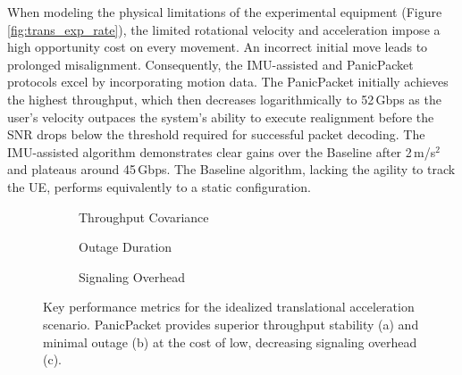 \documentclass[fleqn,10pt]{wlscirep}
\begin{document}
When modeling the physical limitations of the experimental equipment (Figure \ref{fig:trans_exp_rate}), the limited rotational velocity and acceleration impose a high opportunity cost on every movement. An incorrect initial move leads to prolonged misalignment. Consequently, the IMU-assisted and PanicPacket protocols excel by incorporating motion data. The PanicPacket initially achieves the highest throughput, which then decreases logarithmically to 52\,Gbps as the user's velocity outpaces the system's ability to execute realignment before the SNR drops below the threshold required for successful packet decoding. The IMU-assisted algorithm demonstrates clear gains over the Baseline after 2\,m/s$^2$ and plateaus around 45\,Gbps. The Baseline algorithm, lacking the agility to track the UE, performs equivalently to a static configuration.

\begin{figure}[ht!]
    \centering
    \begin{subfigure}[t]{0.49\textwidth}
        \vspace{0pt} %
        \centering
        
        \vspace{-25 pt}
        \caption{Throughput Covariance}
        \label{fig:trans_metrics_covariance}
    \end{subfigure}%
    \hfill
    \begin{minipage}[t]{0.49\textwidth}
        \vspace{0pt} %
        \centering
        \begin{subfigure}{\linewidth}
        
        \vspace{-25 pt}
        \caption{Outage Duration}
        \label{fig:trans_metrics_outage}
    \end{subfigure}
    \vfill
        \begin{subfigure}{\linewidth}
        
        \vspace{-25 pt}
        \caption{Signaling Overhead}
        \label{fig:trans_metrics_overhead}
    \end{subfigure}
    \end{minipage}
    \caption{Key performance metrics for the idealized translational acceleration scenario. PanicPacket provides superior throughput stability (a) and minimal outage (b) at the cost of low, decreasing signaling overhead (c).}
    \label{fig:translational_metrics}
    \vspace{-10 pt}
\end{figure}
\end{document}
